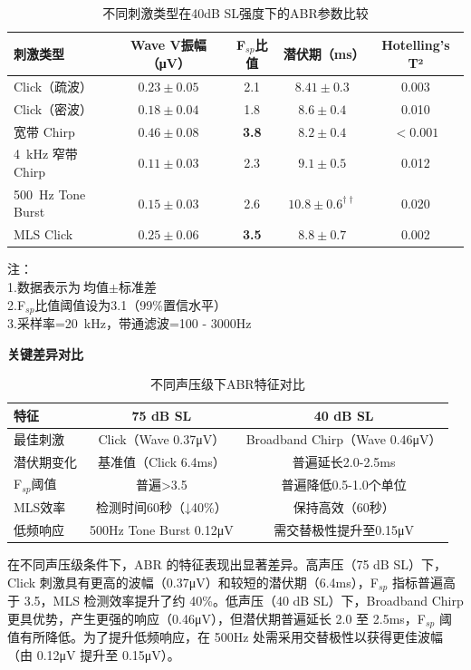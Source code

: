 \begin{table}[H]
\centering
\caption{不同刺激类型在40dB SL强度下的ABR参数比较}
\label{tab:40dbstimulus_comparisonParameter}
\begin{tabular}{lcccc}
\toprule
\textbf{刺激类型} & \textbf{Wave V振幅（\si{\micro V}）} & \textbf{F$_{sp}$比值} & \textbf{潜伏期（ms）} & \textbf{Hotelling's T²} \\
\midrule
Click（疏波） & $0.23 \pm 0.05$ & 2.1 & $8.41\pm 0.3$ & 0.003 \\
Click（密波） & $0.18 \pm 0.04$ & 1.8 & $8.6 \pm 0.4$ & 0.010 \\
宽带 Chirp & $0.46 \pm 0.08$ & \textbf{3.8} & $8.2 \pm 0.4$ & $<0.001$ \\
\SI{4}{kHz} 窄带 Chirp & $0.11 \pm 0.03$ & 2.3 & $9.1 \pm 0.5$ & 0.012 \\
\SI{500}{Hz} Tone Burst & $0.15 \pm 0.03$ & 2.6 & $10.8 \pm 0.6^{\dagger\dagger}$ & 0.020 \\
MLS Click & $0.25 \pm 0.06$ & \textbf{3.5} & $8.8 \pm 0.7$ & 0.002 \\
\bottomrule
\end{tabular}
\end{table}

\noindent \footnotesize 注：\\
1.数据表示为$\text{均值} \pm \text{标准差}$\\
2.F$_{sp}$比值阈值设为3.1（99\%置信水平）\\
3.采样率=\SI{20}{kHz}，带通滤波={100 - 3000}{Hz}
\normalsize 

\textbf{关键差异对比}
\begin{table}[H]
\centering
\caption{不同声压级下ABR特征对比}
\begin{tabular}{|l|c|c|}
\hline
\textbf{特征} & \textbf{75 dB SL} & \textbf{40 dB SL} \\
\hline
最佳刺激 & Click（Wave 0.37μV） & Broadband Chirp（Wave 0.46μV） \\
\hline
潜伏期变化 & 基准值（Click 6.4ms） & 普遍延长2.0-2.5ms \\
\hline
F$_{sp}$阈值 & 普遍>3.5 & 普遍降低0.5-1.0个单位 \\
\hline
MLS效率 & 检测时间60秒（↓40\%） & 保持高效（60秒） \\
\hline
低频响应 & 500Hz Tone Burst 0.12μV & 需交替极性提升至0.15μV \\
\hline
\end{tabular}
\end{table}

在不同声压级条件下，ABR 的特征表现出显著差异。高声压（75 dB SL）下，Click 刺激具有更高的波幅（0.37μV）和较短的潜伏期（6.4ms），F$_{sp}$ 指标普遍高于 3.5，MLS 检测效率提升了约 40\%。低声压（40 dB SL）下，Broadband Chirp 更具优势，产生更强的响应（0.46μV），但潜伏期普遍延长 2.0 至 2.5ms，F$_{sp}$ 阈值有所降低。为了提升低频响应，在 500Hz 处需采用交替极性以获得更佳波幅（由 0.12μV 提升至 0.15μV）。
